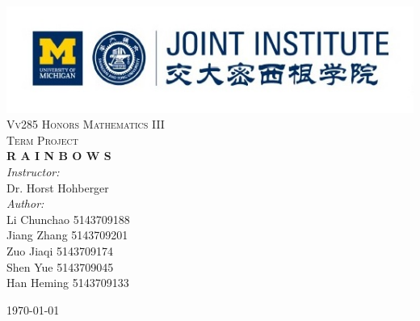 \documentclass{article}
\begin{document}
%
%
\begin{titlepage}
\begin{center}
\includegraphics{logo_1.jpg}\\[1.5cm]

\textsc{\Huge  Vv285 Honors Mathematics III}\\[2cm]

\textsc{\huge  Term Project}\\[1.5cm]

{\huge \bfseries R A I N B O W S}\\[2cm]

\Large \emph{Instructor:}\\
Dr. Horst Hohberger\\[2cm]

\Large \emph{Author:}\\
Li Chunchao	5143709188\\
Jiang Zhang	5143709201\\
Zuo Jiaqi	5143709174\\
Shen Yue	5143709045\\
Han Heming	5143709133

\vfill
{\large \today}
\end{center}
\end{titlepage}
\end{document}
